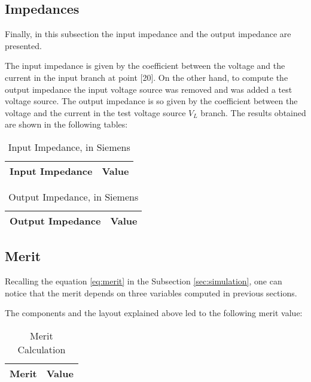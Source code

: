\subsection{Impedances}
\label{impedances}
\par Finally, in this subsection the input impedance and the output impedance are presented.
\par The input impedance is given by the coefficient between the voltage and the current in the input branch at point [20]. On the other hand, to compute the output impedance the input voltage source was removed and was added a test voltage source. The output impedance is so given by the coefficient between the voltage and the current in the test voltage source $V_L$ branch. The results obtained are shown in the following tables:

\begin{table}[H]
  \centering
  \begin{tabular}{|l|r|}
    \hline    
    {\bf Input Impedance} & {\bf Value} \\ \hline
    
  \end{tabular}
  \caption{Input Impedance, in Siemens}
  \label{tab:input_z}
\end{table}


\begin{table}[H]
  \centering
  \begin{tabular}{|l|r|}
    \hline    
    {\bf Output Impedance} & {\bf Value} \\ \hline
    
  \end{tabular}
  \caption{Output Impedance, in Siemens}
  \label{tab:output_z}
\end{table}

\subsection{Merit}
\label{subsec:merit}

\par Recalling the equation \ref{eq:merit} in the Subsection \ref{sec:simulation}, one can notice that the merit depends on three variables computed in previous sections.
\par The components and the layout explained above led to the following merit value:

\begin{table}[H]
  \centering
  \begin{tabular}{ |l|r| } 
    \hline    
    {\bf Merit} & {\bf Value} \\ \hline
    
  \end{tabular}
  \caption{Merit Calculation}
  \label{tab:merit}
\end{table}

